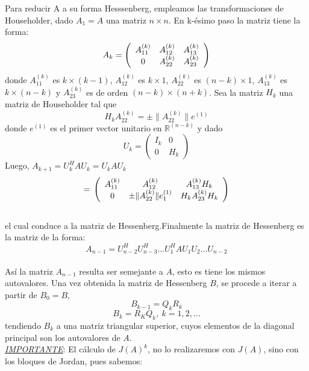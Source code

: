\documentclass[12pt,a4paper]{article}
\begin{document}
\begin{multicols}{2}
	\noindent Para reducir A a su forma Hesssenberg, empleamos las transformaciones de Householder, dado $A_{1}=A$ una matriz $n\times n$. En k-ésimo paso la matriz tiene la forma:\\
	$$A_{k}=\left(\begin{array}{c c c}
	A_{11}^{(k)} & A_{12}^{(k)} & A_{13}^{(k)} \\
	0          & A_{22}^{(k)} & A_{23}^{(k)}
	\end{array}\right)$$ donde $A_{11}^{(k)}$ es $k\times (k-1)$, $A_{12}^{(k)}$ es $k\times1$, $A_{22}^{(k)}$ es $(n-k)\times1$, $A_{13}^{(k)}$ es $k\times(n-k)$ y $A_{23}^{(k)}$ es de orden $(n-k)\times(n+k)$. Sea la matriz $H_{k}$ una matriz de Householder tal que $$H_{k}A_{22}^{(k)}=\pm\|A_{22}^{(k)}\|e^{(1)}$$ donde $e^{(1)}$ es el primer vector unitario en $\mathbb{R}^{(n-k)}$
	y dado $$U_{k}=\left(\begin{array}{cc}
	I_{k}  & 0 \\
	0 & H_{k}
	\end{array}\right)$$
	Luego, $A_{k+1}=U_{k}^{H}AU_{k}=U_{k}AU_{k}$
	$$=\newline\left(\begin{array}{c c c}
	A_{11}^{(k)}    & A_{12}^{(k)}                  & A_{13}^{(k)}H_{k} \\
	0             & \pm\|A_{22}^{(k)}\|e_{1}^{(1)} & H_{k}A_{23}^{(k)}H_{k}
	\end{array}\right)$$\\
	el cual conduce a la matriz de Hessenberg.Finalmente la matriz de Hessenberg es la matriz de la forma:\\
	$$A_{n-1}=U_{n-2}^{H}U_{n-3}^{H}\dots U_{1}^{H}AU_{1}U_{2}\dots U_{n-2}$$
	\\
	Así la  matriz $A_{n-1}$ resulta ser semejante a $A$, esto es tiene los mismos autovalores. Una vez obtenida la matriz de Hessenberg $B$, se procede a iterar a partir de $B_{0}=B$,$$B_{k-1} = Q_{k}R_{k}$$
	$$B_{k}=R_{K}Q_{k}, \  k=1, 2, \dots$$ tendiendo $B_{k}$ a una matriz triangular superior, cuyos elementos de la diagonal principal son los autovalores de $A$.\\
	
	
	\noindent\textit{\underline{IMPORTANTE}}:
	El cálculo de $J(A)^{k}$, no lo realizaremos con $J(A)$, sino con los bloques de Jordan, pues sabemos:
	

\end{multicols}
\end{document}
